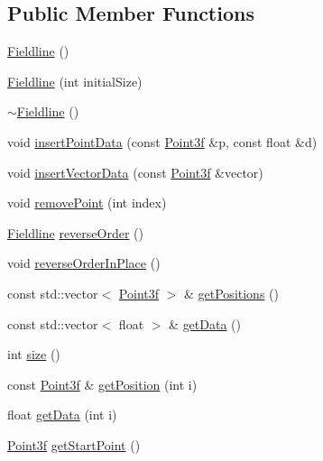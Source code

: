 \subsection*{Public Member Functions}
\begin{DoxyCompactItemize}
\item 
\hyperlink{classccmc_1_1_fieldline_a10b0290c13c4170e468860dc2143fc20}{Fieldline} ()
\item 
\hyperlink{classccmc_1_1_fieldline_a981328dcb0f92191940ef86d76946457}{Fieldline} (int initial\-Size)
\item 
\hyperlink{classccmc_1_1_fieldline_a08964ce404b1cfd462c5d2038d7c1e9e}{$\sim$\-Fieldline} ()
\item 
void \hyperlink{classccmc_1_1_fieldline_a88a8fc4c0ad61639b9138f8dd57bf8e0}{insert\-Point\-Data} (const \hyperlink{classccmc_1_1_point3f}{Point3f} \&p, const float \&d)
\item 
void \hyperlink{classccmc_1_1_fieldline_aef1ecd67ed544173a6c1d702b8fbad92}{insert\-Vector\-Data} (const \hyperlink{classccmc_1_1_point3f}{Point3f} \&vector)
\item 
void \hyperlink{classccmc_1_1_fieldline_a23509bcd88a0a7605c35afaafa58c5c9}{remove\-Point} (int index)
\item 
\hyperlink{classccmc_1_1_fieldline}{Fieldline} \hyperlink{classccmc_1_1_fieldline_a07884d34cad97f14b6810cf23ee003c0}{reverse\-Order} ()
\item 
void \hyperlink{classccmc_1_1_fieldline_a700a5c623e608f3cbc89455bc4e63b83}{reverse\-Order\-In\-Place} ()
\item 
const std\-::vector$<$ \hyperlink{classccmc_1_1_point3f}{Point3f} $>$ \& \hyperlink{classccmc_1_1_fieldline_a0d82bca39360b88914fc312dcb441fb8}{get\-Positions} ()
\item 
const std\-::vector$<$ float $>$ \& \hyperlink{classccmc_1_1_fieldline_af87fd7cd8f79631a255f64d40665fccf}{get\-Data} ()
\item 
int \hyperlink{classccmc_1_1_fieldline_abc4b63ac9b72acd2e6f26b51f659500c}{size} ()
\item 
const \hyperlink{classccmc_1_1_point3f}{Point3f} \& \hyperlink{classccmc_1_1_fieldline_a9f1b0541029d59589902e1ffe2ef75c5}{get\-Position} (int i)
\item 
float \hyperlink{classccmc_1_1_fieldline_afe04791c767345b742c4da719709ddf0}{get\-Data} (int i)
\item 
\hyperlink{classccmc_1_1_point3f}{Point3f} \hyperlink{classccmc_1_1_fieldline_aa693457613225094763e0bc33fe5d730}{get\-Start\-Point} ()

\end{DoxyCompactItemize}

